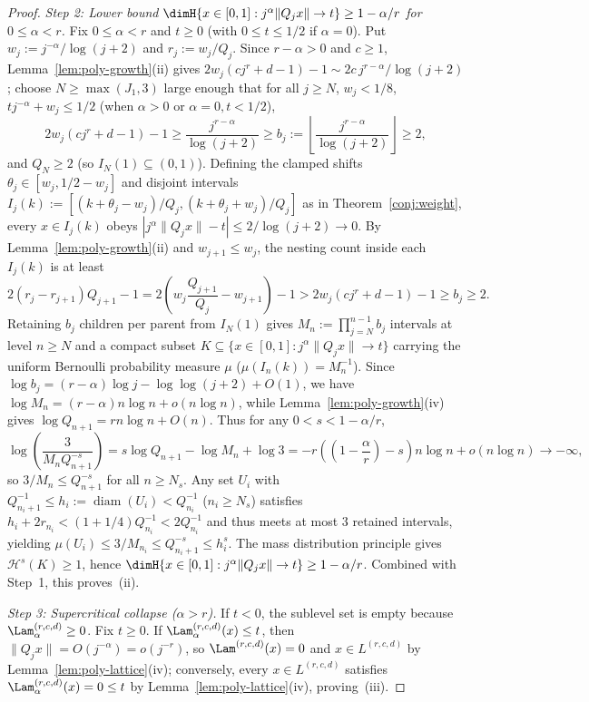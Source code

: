 \begin{proof}
\emph{Step 2: Lower bound $\dimH\{x\in[0,1]:j^\alpha\|Q_jx\|\to t\}\ge1-\alpha/r$
for $0\le\alpha<r$.} Fix $0\le\alpha<r$ and $t\ge0$ (with $0\le t\le1/2$ if
$\alpha=0$). Put $w_j:=j^{-\alpha}/\log(j+2)$ and $r_j:=w_j/Q_j$. Since
$r-\alpha>0$ and $c\ge1$, Lemma~\ref{lem:poly-growth}(ii) gives
$2w_j(cj^r+d-1)-1\sim2c\,j^{r-\alpha}/\log(j+2)$; choose $N\ge\max(J_1,3)$ large
enough that for all $j\ge N$, $w_j<1/8$, $tj^{-\alpha}+w_j\le1/2$ (when
$\alpha>0$ or $\alpha=0,t<1/2$),
\[
2w_j(cj^r+d-1)-1\ge\frac{j^{r-\alpha}}{\log(j+2)}\ge b_j:=\left\lfloor\frac{j^{r-\alpha}}{\log(j+2)}\right\rfloor\ge2,
\]
and $Q_N\ge2$ (so $I_N(1)\subseteq(0,1)$). Defining the clamped shifts
$\theta_j\in[w_j,1/2-w_j]$ and disjoint intervals
$I_j(k):=[(k+\theta_j-w_j)/Q_j,(k+\theta_j+w_j)/Q_j]$ as in
Theorem~\ref{conj:weight}, every $x\in I_j(k)$ obeys
$|j^\alpha\|Q_jx\|-t|\le2/\log(j+2)\to0$. By Lemma~\ref{lem:poly-growth}(ii)
and $w_{j+1}\le w_j$, the nesting count inside each $I_j(k)$ is at least
\[
2(r_j-r_{j+1})Q_{j+1}-1=2\left(w_j\frac{Q_{j+1}}{Q_j}-w_{j+1}\right)-1
>2w_j(cj^r+d-1)-1\ge b_j\ge2.
\]
Retaining $b_j$ children per parent from $I_N(1)$ gives
$M_n:=\prod_{j=N}^{n-1}b_j$ intervals at level $n\ge N$ and a compact subset
$K\subseteq\{x\in[0,1]:j^\alpha\|Q_jx\|\to t\}$ carrying the uniform Bernoulli
probability measure $\mu$ ($\mu(I_n(k))=M_n^{-1}$). Since
$\log b_j=(r-\alpha)\log j-\log\log(j+2)+O(1)$, we have
$\log M_n=(r-\alpha)n\log n+o(n\log n)$, while Lemma~\ref{lem:poly-growth}(iv)
gives $\log Q_{n+1}=rn\log n+O(n)$. Thus for any $0<s<1-\alpha/r$,
\[
\log\left(\frac{3}{M_nQ_{n+1}^{-s}}\right)
=s\log Q_{n+1}-\log M_n+\log3
=-r\left(\left(1-\frac{\alpha}{r}\right)-s\right)n\log n+o(n\log n)\longrightarrow-\infty,
\]
so $3/M_n\le Q_{n+1}^{-s}$ for all $n\ge N_s$. Any set $U_i$ with
$Q_{n_i+1}^{-1}\le h_i:=\operatorname{diam}(U_i)<Q_{n_i}^{-1}$ ($n_i\ge N_s$)
satisfies $h_i+2r_{n_i}<(1+1/4)Q_{n_i}^{-1}<2Q_{n_i}^{-1}$ and thus meets at
most $3$ retained intervals, yielding $\mu(U_i)\le3/M_{n_i}\le Q_{n_i+1}^{-s}\le h_i^s$.
The mass distribution principle gives $\mathcal H^s(K)\ge1$, hence
$\dimH\{x\in[0,1]:j^\alpha\|Q_jx\|\to t\}\ge1-\alpha/r$. Combined with Step~1,
this proves~(ii).

\emph{Step 3: Supercritical collapse ($\alpha>r$).} If $t<0$, the sublevel set
is empty because $\Lam_\alpha^{(r,c,d)}\ge0$. Fix $t\ge0$. If
$\Lam_\alpha^{(r,c,d)}(x)\le t$, then $\|Q_jx\|=O(j^{-\alpha})=o(j^{-r})$, so
$\Lam^{(r,c,d)}(x)=0$ and $x\in L^{(r,c,d)}$ by Lemma~\ref{lem:poly-lattice}(iv);
conversely, every $x\in L^{(r,c,d)}$ satisfies $\Lam_\alpha^{(r,c,d)}(x)=0\le t$
by Lemma~\ref{lem:poly-lattice}(iv), proving~(iii).
\end{proof}

